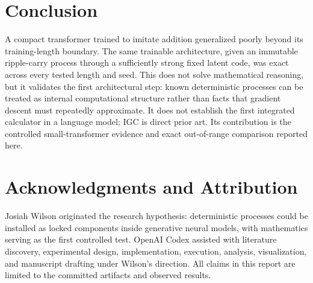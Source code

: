\documentclass[11pt]{article}
\begin{document}
\section{Conclusion}

A compact transformer trained to imitate addition generalized poorly beyond
its training-length boundary. The same trainable architecture, given an
immutable ripple-carry process through a sufficiently strong fixed latent code,
was exact across every tested length and seed. This does not solve mathematical
reasoning, but it validates the first architectural step: known deterministic
processes can be treated as internal computational structure rather than facts
that gradient descent must repeatedly approximate. It does not establish the
first integrated calculator in a language model; IGC is direct prior art. Its
contribution is the controlled small-transformer evidence and exact
out-of-range comparison reported here.

\section*{Acknowledgments and Attribution}

Josiah Wilson originated the research hypothesis: deterministic processes
could be installed as locked components inside generative neural models, with
mathematics serving as the first controlled test. OpenAI Codex assisted with
literature discovery, experimental design, implementation, execution,
analysis, visualization, and manuscript drafting under Wilson's direction.
All claims in this report are limited to the committed artifacts and observed
results.
\end{document}
